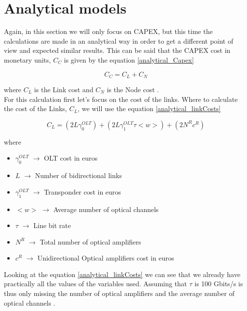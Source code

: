 
\section{Analytical models}\label{analytical_CAPEX}

Again, in this section we will only focus on CAPEX, but this time the calculations are made in an analytical way in order to get a different point of view and expected similar results.
This can be said that the CAPEX cost in monetary units, $C_C$ is given by the equation \ref{analytical_Capex}

\begin{equation}
C_C = C_L + C_N
\label{analytical_Capex}
\end{equation}

\noindent
where $C_L$ is the Link cost and $C_N$ is the Node cost \cite{aulas}.\\

For this calculation first let's focus on the cost of the links. Where to calculate the cost of the Links, $C_L$, we will use the equation \ref{analytical_linkCosts}

\begin{equation}
C_L = \left(2 L \gamma_0^{OLT}\right) + \left(2 L \gamma_1^{OLT} \tau <w>\right) + \left(2 N^R c^R\right)
\label{analytical_linkCosts}
\end{equation}

\vspace{11pt}
\noindent
where
\begin{itemize}
\item{$\gamma_0^{OLT}$	$\rightarrow$	OLT cost in euros}
\item{$L$				$\rightarrow$	Number of bidirectional links}
\item{$\gamma_1^{OLT}$	$\rightarrow$	Transponder cost in euros}
\item{$<w>$             $\rightarrow$   Average number of optical channels}
\item{$\tau$		    $\rightarrow$	Line bit rate}
\item{$N^R$				$\rightarrow$	Total number of optical amplifiers}
\item{$c^R$				$\rightarrow$	Unidirectional Optical amplifiers cost in euros}
\end{itemize}

\vspace{11pt}
Looking at the equation \ref{analytical_linkCosts} we can see that we already have practically all the values of the variables used. Assuming that $\tau$ is 100 Gbits/s is thus only missing the number of optical amplifiers and the average number of optical channels \cite{aulas}.\\

